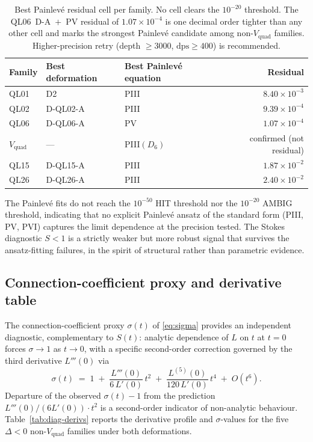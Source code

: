 \documentclass[11pt,reqno]{amsart}
\theoremstyle{definition}
\begin{document}
\begin{table}[h]
\centering
\begin{tabular}{lllr}
\toprule
Family & Best deformation & Best Painlev\'e equation & Residual \\
\midrule
QL01                & D2        & PIII             & $8.40\times 10^{-3}$ \\
QL02                & D-QL02-A  & PIII             & $9.39\times 10^{-4}$ \\
QL06                & D-QL06-A  & PV               & $1.07\times 10^{-4}$ \\
$V_{\mathrm{quad}}$ & ---       & PIII$(D_{6})$    & confirmed (not residual) \\
QL15                & D-QL15-A  & PIII             & $1.87\times 10^{-2}$ \\
QL26                & D-QL26-A  & PIII             & $2.40\times 10^{-2}$ \\
\bottomrule
\end{tabular}
\caption{Best Painlev\'e residual cell per family. No cell
clears the $10^{-20}$ threshold. The
QL06~D-A~$+$~PV residual of $1.07\times 10^{-4}$ is one
decimal order tighter than any other cell and marks the
strongest Painlev\'e candidate among non-$V_{\mathrm{quad}}$
families. Higher-precision retry (depth $\ge 3000$,
$\mathrm{dps}\ge 400$) is recommended.}
\label{tab:residuals}
\end{table}

The Painlev\'e fits do not reach the $10^{-50}$ HIT threshold
nor the $10^{-20}$ AMBIG threshold, indicating that no
explicit Painlev\'e ansatz of the standard form (PIII, PV,
PVI) captures the limit dependence at the precision tested.
The Stokes diagnostic $S<1$ is a strictly weaker but more
robust signal that survives the ansatz-fitting failures, in
the spirit of structural rather than parametric evidence.

\subsection{Connection-coefficient proxy and derivative table}
\label{ssec:sigma-table}

The connection-coefficient proxy $\sigma(t)$ of \eqref{eq:sigma}
provides an independent diagnostic, complementary to $S(t)$:
analytic dependence of $L$ on $t$ at $t=0$ forces $\sigma\to 1$
as $t\to 0$, with a specific second-order correction governed
by the third derivative $L'''(0)$ via
\begin{equation}\label{eq:sigma-expand}
\sigma(t) \;=\;
1 \;+\; \frac{L'''(0)}{6\,L'(0)}\,t^{2}
\;+\; \frac{L^{(5)}(0)}{120\,L'(0)}\,t^{4} \;+\; O(t^{6}).
\end{equation}
Departure of the observed $\sigma(t)-1$ from the prediction
$L'''(0)/(6L'(0))\cdot t^{2}$ is a second-order indicator of
non-analytic behaviour. Table~\ref{tab:diag-derivs} reports
the derivative profile and $\sigma$-values for the five
$\Delta<0$ non-$V_{\mathrm{quad}}$ families under both
deformations.
\end{document}
